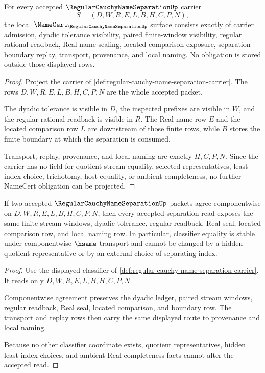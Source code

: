 \begin{theorem}
\label{thm:regular-cauchy-name-separation-namecert-obligations}
For every accepted $\RegularCauchyNameSeparationUp$ carrier
$$
S=(D,W,R,E,L,B,H,C,P,N),
$$
the local $\NameCert_{\RegularCauchyNameSeparationUp}$ surface consists exactly of carrier admission, dyadic tolerance visibility, paired finite-window visibility, regular rational readback, Real-name sealing, located comparison exposure, separation-boundary replay, transport, provenance, and local naming. No obligation is stored outside those displayed rows.
\end{theorem}
\begin{proof}
Project the carrier of \autoref{def:regular-cauchy-name-separation-carrier}. The rows $D,W,R,E,L,B,H,C,P,N$ are the whole accepted packet.

The dyadic tolerance is visible in $D$, the inspected prefixes are visible in $W$, and the regular rational readback is visible in $R$. The Real-name row $E$ and the located comparison row $L$ are downstream of those finite rows, while $B$ stores the finite boundary at which the separation is consumed.

Transport, replay, provenance, and local naming are exactly $H,C,P,N$. Since the carrier has no field for quotient stream equality, selected representatives, least-index choice, trichotomy, host equality, or ambient completeness, no further NameCert obligation can be projected.
\end{proof}

\begin{theorem}
\label{thm:regular-cauchy-name-separation-classifier-stability}
If two accepted $\RegularCauchyNameSeparationUp$ packets agree componentwise on $D,W,R,E,L,B,H,C,P,N$, then every accepted separation read exposes the same finite stream windows, dyadic tolerance, regular readback, Real seal, located comparison row, and local naming row. In particular, classifier equality is stable under componentwise $\hsame$ transport and cannot be changed by a hidden quotient representative or by an external choice of separating index.
\end{theorem}
\begin{proof}
Use the displayed classifier of \autoref{def:regular-cauchy-name-separation-carrier}. It reads only $D,W,R,E,L,B,H,C,P,N$.

Componentwise agreement preserves the dyadic ledger, paired stream windows, regular readback, Real seal, located comparison, and boundary row. The transport and replay rows then carry the same displayed route to provenance and local naming.

Because no other classifier coordinate exists, quotient representatives, hidden least-index choices, and ambient Real-completeness facts cannot alter the accepted read.
\end{proof}

